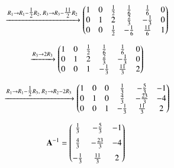 \documentclass[journal]{article}
\begin{document}
\begin{align}
&\xrightarrow{R_1 \to R_1-\tfrac12R_2,\; R_3 \to R_3-\tfrac{11}{2}R_2}
\begin{pmatrix}1 & 0 & \tfrac12 & \tfrac16 & \tfrac16 & 0 \\
       0 & 1 & 2 & \tfrac23 & -\tfrac13 & 0 \\
       0 & 0 & \tfrac12 & -\tfrac16 & \tfrac{11}{6} & 1\end{pmatrix}
\end{align}

\begin{align}
&\xrightarrow{R_3 \to 2R_3}
\begin{pmatrix}1 & 0 & \tfrac12 & \tfrac16 & \tfrac16 & 0 \\
       0 & 1 & 2 & \tfrac23 & -\tfrac13 & 0 \\
       0 & 0 & 1 & -\tfrac13 & \tfrac{11}{3} & 2\end{pmatrix}
\end{align}

\begin{align}
&\xrightarrow{R_1 \to R_1-\tfrac12R_3,\; R_2 \to R_2-2R_3}
\begin{pmatrix}1 & 0 & 0 & \tfrac13 & -\tfrac53 & -1 \\
       0 & 1 & 0 & \tfrac43 & -\tfrac{23}{3} & -4 \\
       0 & 0 & 1 & -\tfrac13 & \tfrac{11}{3} & 2\end{pmatrix}
\end{align}

\begin{align}
\mathbf{A}^{-1} &=
\begin{pmatrix}\tfrac13 & -\tfrac53 & -1 \\[6pt]
       \tfrac43 & -\tfrac{23}{3} & -4 \\[6pt]
       -\tfrac13 & \tfrac{11}{3} & 2\end{pmatrix}
\end{align}
\end{document}
